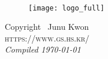 \clearpage
	~\vfill
	\thispagestyle{empty}
	
	\begin{figure}[h]
		\texttt{[image: logo\_full]}
	\end{figure}
	
	\noindent Copyright \textcopyright\the\year\ Junu Kwon \\ %
	
	\noindent \textsc{https://www.gs.hs.kr/}\\ %
	
	\noindent \textit{Compiled \today} %
	
	\if@openright\cleardoublepage\else\clearpage\fi